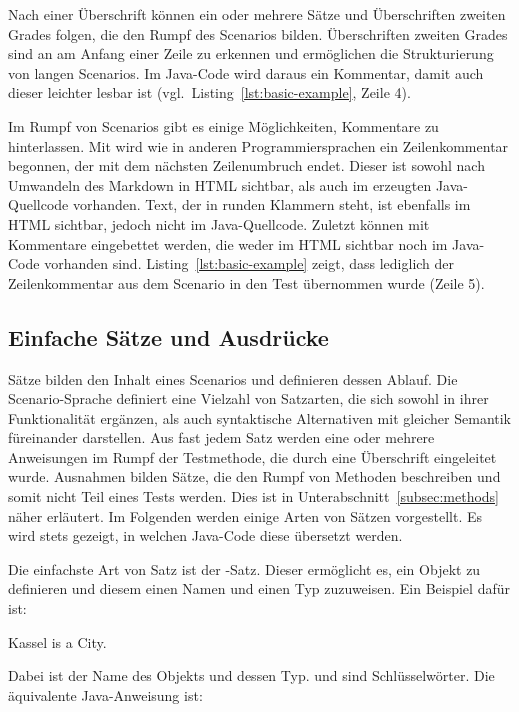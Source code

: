 Nach einer Überschrift können ein oder mehrere Sätze und Überschriften zweiten Grades folgen, die den Rumpf des Scenarios bilden.
Überschriften zweiten Grades sind an \mdcode{##} am Anfang einer Zeile zu erkennen und ermöglichen die Strukturierung von langen Scenarios.
Im Java-Code wird daraus ein Kommentar, damit auch dieser leichter lesbar ist (vgl.\ Listing~\ref{lst:basic-example}, Zeile 4).

Im Rumpf von Scenarios gibt es einige Möglichkeiten, Kommentare zu hinterlassen.
Mit \jcode{//} wird wie in anderen Programmiersprachen ein Zeilenkommentar begonnen, der mit dem nächsten Zeilenumbruch endet.
Dieser ist sowohl nach Umwandeln des Markdown in HTML sichtbar, als auch im erzeugten Java-Quellcode vorhanden.
Text, der in runden Klammern  steht, ist ebenfalls im HTML sichtbar, jedoch nicht im Java-Quellcode.
Zuletzt können mit  Kommentare eingebettet werden, die weder im HTML sichtbar noch im Java-Code vorhanden sind.
Listing~\ref{lst:basic-example} zeigt, dass lediglich der Zeilenkommentar aus dem Scenario in den Test übernommen wurde (Zeile 5).

\subsection{Einfache Sätze und Ausdrücke}\label{subsec:simple-sentences-and-expressions}

Sätze bilden den Inhalt eines Scenarios und definieren dessen Ablauf.
Die Scenario-Sprache definiert eine Vielzahl von Satzarten, die sich sowohl in ihrer Funktionalität ergänzen, als auch syntaktische Alternativen mit gleicher Semantik füreinander darstellen.
Aus fast jedem Satz werden eine oder mehrere Anweisungen im Rumpf der Testmethode, die durch eine Überschrift eingeleitet wurde.
Ausnahmen bilden Sätze, die den Rumpf von Methoden beschreiben und somit nicht Teil eines Tests werden.
Dies ist in Unterabschnitt~\ref{subsec:methods} näher erläutert.
Im Folgenden werden einige Arten von Sätzen vorgestellt.
Es wird stets gezeigt, in welchen Java-Code diese übersetzt werden.

Die einfachste Art von Satz ist der -Satz.
Dieser ermöglicht es, ein Objekt zu definieren und diesem einen Namen und einen Typ zuzuweisen.
Ein Beispiel dafür ist:

\begin{codeblock}
    Kassel is a City.
\end{codeblock}

Dabei ist  der Name des Objekts und  dessen Typ.
 und  sind Schlüsselwörter.
Die äquivalente Java-Anweisung ist:

